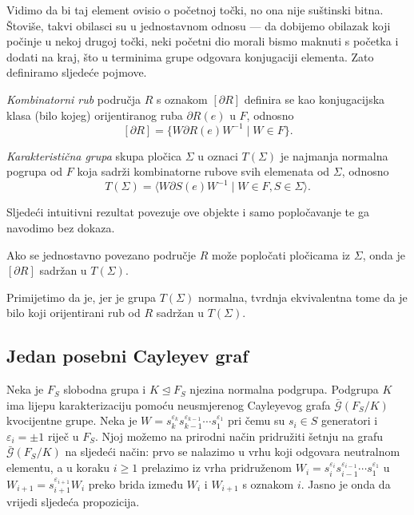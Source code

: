 \documentclass[11pt]{scrartcl}
\begin{document}
Vidimo da bi taj element ovisio o početnoj točki, no ona nije suštinski bitna. Štoviše, takvi obilasci su u jednostavnom odnosu --- da dobijemo obilazak koji počinje u nekoj drugoj točki, neki početni dio morali bismo maknuti s početka i dodati na kraj, što u terminima grupe odgovara konjugaciji elementa. Zato definiramo sljedeće pojmove.
\begin{definicija}
\emph{Kombinatorni rub} područja $R$ s oznakom $[\partial R]$ definira se kao konjugacijska klasa (bilo kojeg) orijentiranog ruba $\partial R(e)$ u $F$, odnosno
\[
[\partial R] = \{ W \partial R(e) W^{-1}  \mid W \in F\}.
\]
\end{definicija}
\begin{definicija}
\emph{Karakteristična grupa} skupa pločica $\Sigma$ u oznaci $T(\Sigma)$ je najmanja normalna pogrupa od $F$ koja sadrži kombinatorne rubove svih elemenata od $\Sigma$, odnosno
\[
T(\Sigma) = \langle W\partial S(e) W^{-1} \mid W \in F, S \in \Sigma\rangle.
\]
\end{definicija}
Sljedeći intuitivni rezultat povezuje ove objekte i samo popločavanje te ga navodimo bez dokaza.
\begin{teorem} \label{grupe:nuzno}
Ako se jednostavno povezano područje $R$ može popločati pločicama iz $\Sigma$, onda je $[\partial R]$ sadržan u $T(\Sigma)$.
\end{teorem}
\noindent Primijetimo da je, jer je grupa $T(\Sigma)$ normalna, tvrdnja ekvivalentna tome da je bilo koji orijentirani rub od $R$ sadržan u $T(\Sigma)$.

\subsection{Jedan posebni Cayleyev graf}
Neka je $F_S$ slobodna grupa i $K \unlhd F_S$ njezina normalna podgrupa. Podgrupa $K$ ima lijepu karakterizaciju pomoću neusmjerenog Cayleyevog grafa $\bar{\mathcal{G}}(F_S/K)$ kvocijentne grupe. Neka je $W = s_k^{\varepsilon_k} s_{k-1}^{\varepsilon_{k-1}} \dotsm s_1^{\varepsilon_1}$ pri čemu su $s_i \in S$ generatori i $\varepsilon_i = \pm 1$ riječ u $F_S$. Njoj možemo na prirodni način pridružiti šetnju na grafu $\bar{\mathcal{G}}(F_S/K)$ na sljedeći način: prvo se nalazimo u vrhu koji odgovara neutralnom elementu, a u koraku $i \geq 1$ prelazimo iz vrha pridruženom $W_i = s_i^{\varepsilon_i} s_{i-1}^{\varepsilon_{i-1}} \dotsm s_1^{\varepsilon_1}$ u $W_{i+1} = s_{i+1}^{\varepsilon_{i+1}} W_i$ preko brida između $W_i$ i $W_{i+1}$ s oznakom $i$. Jasno je onda da vrijedi sljedeća propozicija.
\end{document}
